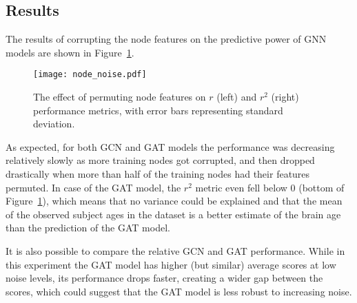 \subsection{Results}

The results of corrupting the node features on the predictive power of GNN models are shown in Figure~\ref{figure:node-noise}.



\begin{figure}[h]
    \centering
    \texttt{[image: node\_noise.pdf]}
    \caption{The effect of permuting node features on $r$ (left) and $r^2$ (right) performance metrics, with error bars representing standard deviation.}\label{figure:node-noise}
\end{figure}

As expected, for both GCN and GAT models the performance was decreasing relatively slowly as more training nodes got corrupted, and then dropped drastically when more than half of the training nodes had their features permuted. In case of the GAT model, the $r^2$ metric even fell below 0 (bottom of Figure~\ref{figure:node-noise}), which means that no variance could be explained and that the mean of the observed subject ages in the dataset is a better estimate of the brain age than the prediction of the GAT model. 

It is also possible to compare the relative GCN and GAT performance. While in this experiment the GAT model has higher (but similar) average scores at low noise levels, its performance drops faster, creating a wider gap between the scores, which could suggest that the GAT model is less robust to increasing noise. 



